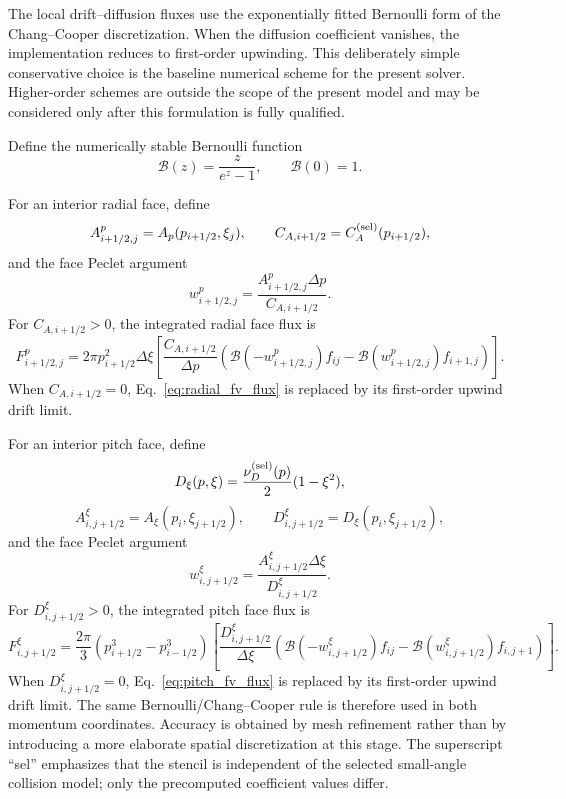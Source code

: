\documentclass[11pt]{article}
\begin{document}
The local drift--diffusion fluxes use the exponentially fitted Bernoulli form of the
Chang--Cooper discretization.  When the diffusion coefficient vanishes, the implementation
reduces to first-order upwinding.  This deliberately simple conservative choice is the
baseline numerical scheme for the present solver.  Higher-order schemes are outside the
scope of the present model and may be considered only after this formulation is fully
qualified.

Define the numerically stable Bernoulli function
\begin{equation}
 \mathcal B(z)=\frac{z}{e^z-1},\qquad \mathcal B(0)=1.
 \label{eq:bernoulli_function}
\end{equation}

For an interior radial face, define
\begin{equation}
 A^p_{i+1/2,j}=A_p(p_{i+1/2},\xi_j),\qquad
 C_{A,i+1/2}=C_A^{({\rm sel})}(p_{i+1/2}),
\end{equation}
and the face Peclet argument
\begin{equation}
 w^p_{i+1/2,j}=\frac{A^p_{i+1/2,j}\Delta p}{C_{A,i+1/2}}.
 \label{eq:radial_peclet}
\end{equation}
For $C_{A,i+1/2}>0$, the integrated radial face flux is
\begin{equation}
 F^p_{i+1/2,j}
 =2\pi p_{i+1/2}^2\Delta\xi
 \left[
 \frac{C_{A,i+1/2}}{\Delta p}
 \left(
   \mathcal B(-w^p_{i+1/2,j})f_{ij}
  -\mathcal B(w^p_{i+1/2,j})f_{i+1,j}
 \right)
 \right].
 \label{eq:radial_fv_flux}
\end{equation}
When $C_{A,i+1/2}=0$, Eq.~\eqref{eq:radial_fv_flux} is replaced by its first-order
upwind drift limit.

For an interior pitch face, define
\begin{equation}
 D_\xi(p,\xi)=\frac{\nu_D^{({\rm sel})}(p)}{2}(1-\xi^2),
\end{equation}
\begin{equation}
 A^\xi_{i,j+1/2}=A_\xi(p_i,\xi_{j+1/2}),\qquad
 D^\xi_{i,j+1/2}=D_\xi(p_i,\xi_{j+1/2}),
\end{equation}
and the face Peclet argument
\begin{equation}
 w^\xi_{i,j+1/2}=\frac{A^\xi_{i,j+1/2}\Delta\xi}{D^\xi_{i,j+1/2}}.
 \label{eq:pitch_peclet}
\end{equation}
For $D^\xi_{i,j+1/2}>0$, the integrated pitch face flux is
\begin{equation}
 F^\xi_{i,j+1/2}
 =\frac{2\pi}{3}
  \left(p_{i+1/2}^3-p_{i-1/2}^3\right)
 \left[
 \frac{D^\xi_{i,j+1/2}}{\Delta\xi}
 \left(
   \mathcal B(-w^\xi_{i,j+1/2})f_{ij}
  -\mathcal B(w^\xi_{i,j+1/2})f_{i,j+1}
 \right)
 \right].
 \label{eq:pitch_fv_flux}
\end{equation}
When $D^\xi_{i,j+1/2}=0$, Eq.~\eqref{eq:pitch_fv_flux} is replaced by its first-order
upwind drift limit.  The same Bernoulli/Chang--Cooper rule is therefore used in both
momentum coordinates.  Accuracy is obtained by mesh refinement rather than by
introducing a more elaborate spatial discretization at this stage.
The superscript ``sel'' emphasizes that the stencil is independent of the selected
small-angle collision model; only the precomputed coefficient values differ.
\end{document}
